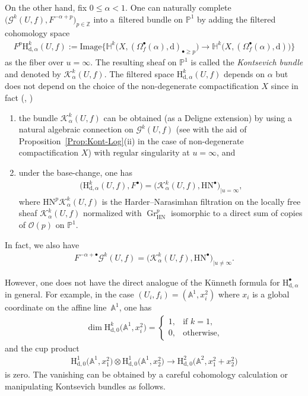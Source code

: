 \documentclass[pdftex]{sigma}
\renewcommand{\AA}{\mathbb{A}}
\newcommand{\HH}{\mathbb{H}}
\newcommand{\PP}{\mathbb{P}}
\newcommand{\ZZ}{\mathbb{Z}}
\newcommand{\sG}{\mathscr{G}}
\newcommand{\sK}{\mathscr{K}}
\newcommand{\sO}{\mathscr{O}}
\newcommand{\de}{\mathrm{d}}
\newcommand{\coH}{\mathrm{H}}
\newcommand{\cpt}{compactification}
\newcommand{\Gr}{\operatorname{Gr}}
\newcommand{\HN}{\mathrm{HN}}
\newcommand{\rest}[1]{_{|{#1}}}
\begin{document}
On the other hand, fix $0\leq \alpha <1$. One can naturally complete $\big(\sG^k(U,f), F^{-\alpha +p}\big)_{p \in\ZZ}$ into a~filtered bundle on $\PP^1$ by adding the filtered cohomology space
\begin{gather*} F^p\coH_{\de,\alpha}^k(U,f) :=\mathrm{Image}\big\{\HH^k\big(X, (\Omega_f^\bullet(\alpha),\de)_{\bullet \geq p} \big)\to \HH^k\big(X, (\Omega_f^\bullet(\alpha),\de)\big) \big\} \end{gather*}
as the fiber over $u = \infty$. The resulting sheaf on $\PP^1$ is called the \textit{Kontsevich bundle} and denoted by $\sK_\alpha^k(U,f)$. The filtered space $\coH_{\de,\alpha}^k(U,f)$ depends on $\alpha$ but does not depend on the choice of the non-degenerate {\cpt} $X$ since in fact (\cite[Theorem~1.11(a), Section~1.3]{SY}, \cite[Theorem~1.2(i,ii)]{M_Kont})
\begin{enumerate} \itemsep=0pt
\item the bundle $\sK_\alpha^k(U,f)$ can be obtained (as a Deligne extension) by using a natural algebraic connection on $\sG^k(U,f)$ (see \cite[Lemma 6.2]{SY} with the aid of Proposition~\ref{Prop:Kont-Log}(ii) in the case of non-degenerate {\cpt} $X$) with regular singularity at $u=\infty$, and
\item under the base-change, one has
\begin{gather}\label{eq:d_HN}
\big(\coH_{\de,\alpha}^k(U,f), F^\bullet\big) = \big(\sK_\alpha^k(U,f), \HN^\bullet\big)\rest{u=\infty},
\end{gather}
where $\HN^p\sK^k_\alpha(U,f)$ is the Harder--Narasimhan filtration on the locally free sheaf $\sK^k_\alpha(U,f)$ normalized with $\Gr_{\HN}^p$ isomorphic to a direct sum of copies of $\sO(p)$ on $\PP^1$.
\end{enumerate}
In fact, we also have
\begin{gather}\label{eq:ddRH_HN}
F^{-\alpha+\bullet}\sG^k(U,f) =\big(\sK_\alpha^k(U,f), \HN^\bullet\big)\rest{u\neq\infty}.
\end{gather}

However, one does not have the direct analogue of the K\"unneth formula for $\coH_{\de,\alpha}^\bullet$ in general. For example, in the case $(U_i,f_i) = (\AA^1,x_i^2)$ where $x_i$ is a global coordinate on the affine line~$\AA^1$, one has
\begin{gather*} \dim \coH_{\de,0}^k\big(\AA^1,x_i^2\big) = \begin{cases}
1, & \text{if $k = 1$}, \\
0, & \text{otherwise},
\end{cases} \end{gather*}
and the cup product
\begin{gather}\label{eq:cup_zero}
\coH_{\de,0}^1\big(\AA^1,x_1^2\big) \otimes \coH_{\de,0}^1\big(\AA^1,x_2^2\big) \to \coH_{\de,0}^2\big(\AA^2,x_1^2+x_2^2\big)
\end{gather}
is zero. The vanishing can be obtained by a careful cohomology calculation or manipulating Kontsevich bundles as follows.
\end{document}
